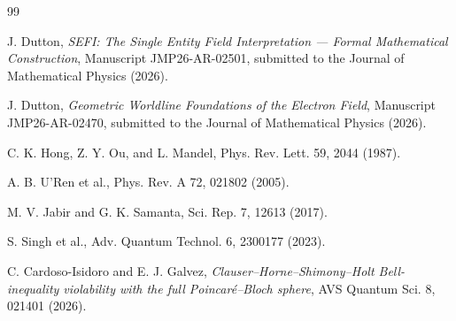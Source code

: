 \documentclass[aip, reprint, superscriptaddress]{revtex4-2}
\begin{document}
\begin{thebibliography}{99}

J. Dutton, \textit{SEFI: The Single Entity Field Interpretation --- Formal Mathematical Construction}, 
Manuscript JMP26-AR-02501, submitted to the Journal of Mathematical Physics (2026).

J. Dutton, \textit{Geometric Worldline Foundations of the Electron Field}, 
Manuscript JMP26-AR-02470, submitted to the Journal of Mathematical Physics (2026).

C. K. Hong, Z. Y. Ou, and L. Mandel, Phys. Rev. Lett. 59, 2044 (1987).

A. B. U'Ren et al., Phys. Rev. A 72, 021802 (2005).

M. V. Jabir and G. K. Samanta, Sci. Rep. 7, 12613 (2017).

S. Singh et al., Adv. Quantum Technol. 6, 2300177 (2023).

C. Cardoso-Isidoro and E. J. Galvez, 
\textit{Clauser–Horne–Shimony–Holt Bell-inequality violability with the full Poincaré–Bloch sphere}, 
AVS Quantum Sci. 8, 021401 (2026).

\end{thebibliography}
\end{document}
